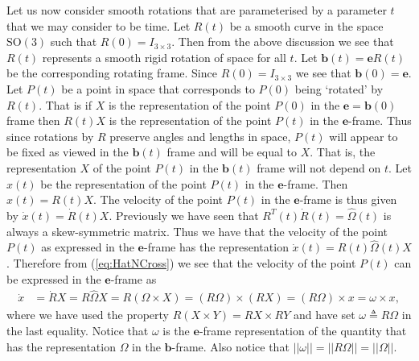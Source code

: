 \documentclass[graybox,envcountchap,sectrefs]{svmonoMuga}
\begin{document}
Let us now consider smooth rotations that are parameterised by a parameter $t$ that we may consider to be time. Let $R(t)$ be a smooth curve in the space $\mathrm{SO}(3)$ such that $R(0)=I_{3\times 3}$. Then from the above discussion we see that $R(t)$ represents a smooth rigid rotation of space for all $t$. Let $\mathbf{b}(t)=\mathbf{e}R(t)$ be the corresponding rotating frame. Since $R(0)=I_{3\times 3}$ we see that $\mathbf{b}(0)=\mathbf{e}$. Let $P(t)$ be a point in space that corresponds to $P(0)$ being `rotated' by $R(t)$. That is if $X$ is the representation of the point $P(0)$ in the $\mathbf{e}=\mathbf{b}(0)$ frame then $R(t)X$ is the representation of the point $P(t)$ in the 
$\mathbf{e}$-frame.
 Thus since rotations by $R$ preserve angles and lengths in space, $P(t)$ will appear to be fixed as viewed in the $\mathbf{b}(t)$ frame and will be equal to $X$. That is, the representation $X$ of the point $P(t)$ in the $\mathbf{b}(t)$ frame will not depend on $t$. Let $x(t)$ be the representation of the point $P(t)$ in the $\mathbf{e}$-frame. Then $x(t)=R(t)X$.
The velocity of the point $P(t)$ in the $\mathbf{e}$-frame is thus given by $\dot{x}(t)=\dot{R}(t)X$.
Previously we have seen that $R^T(t)\dot{R}(t)=\widehat{\Omega}(t)$ is always a skew-symmetric matrix. Thus we have that the velocity of the point $P(t)$ as expressed in the $\mathbf{e}$-frame has the representation
$\dot{x}(t)={R}(t)\widehat{\Omega}(t)X$.
Therefore from (\ref{eq:HatNCross}) we see that the velocity of the point $P(t)$ can be expressed in the $\mathbf{e}$-frame as 
\begin{align}
\dot{x}&=\dot{R}X=R\widehat{\Omega}X=R(\Omega \times X)=(R\Omega) \times (RX)=(R\Omega) \times x
=\omega\times x,\label{eq:Dotx}
\end{align}
where we have used the property $R(X\times Y)=RX\times RY$ and have set $\omega\triangleq R\Omega$ in the last equality. Notice that $\omega$ is the $\mathbf{e}$-frame representation of the quantity that has the representation $\Omega$ in the $\mathbf{b}$-frame. Also notice that $||\omega||=||R\Omega||=||\Omega||$.  
\end{document}
